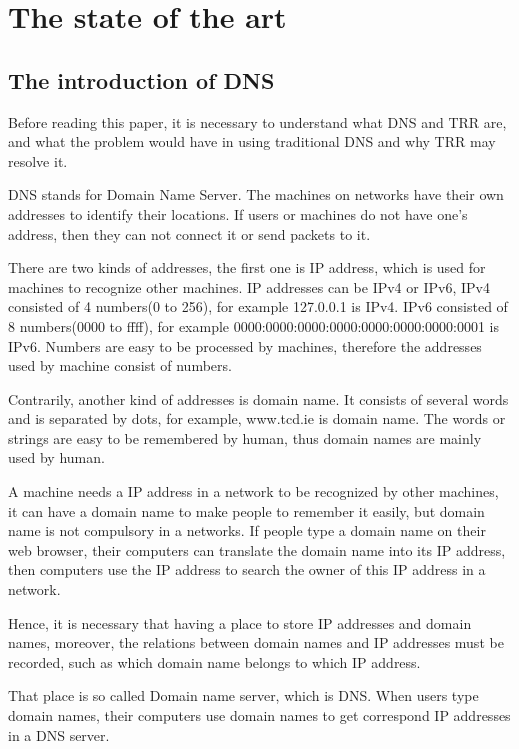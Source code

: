 
\chapter{The state of the art}

	\section{The introduction of DNS}
	
	Before reading this paper, it is necessary to understand what DNS and TRR are, and what the problem would have in using traditional DNS and why TRR may resolve it.
	
	DNS stands for Domain Name Server. The machines on networks have their own addresses to identify their locations. If users or machines do not have one's address, then they can not connect it or send packets to it.
	
	There are two kinds of addresses, the first one is IP address, which is used for machines to recognize other machines. IP addresses can be IPv4 or IPv6, IPv4 consisted of 4 numbers(0 to 256)\cite{IPv4}, for example 127.0.0.1 is IPv4. IPv6 consisted of 8 numbers(0000 to ffff)\cite{IPv6}, for example 0000:0000:0000:0000:0000:0000:0000:0001 is IPv6. Numbers are easy to be processed by machines, therefore the addresses used by machine consist of numbers.
	
	Contrarily, another kind of addresses is domain name. It consists of several words and is separated by dots, for example, www.tcd.ie is domain name. The words or strings are easy to be remembered by human, thus domain names are mainly used by human\cite{Domain_name}. 
	
	A machine needs a IP address in a network to be recognized by other machines, it can have a domain name to make people to remember it easily, but domain name is not compulsory in a networks. If people type a domain name on their web browser, their computers can translate the domain name into its IP address, then computers use the IP address to search the owner of this IP address in a network.
	
	Hence, it is necessary that having a place to store IP addresses and domain names, moreover, the relations between domain names and IP addresses must be recorded, such as which domain name belongs to which IP address.
	
	That place is so called Domain name server, which is DNS. When users type domain names, their computers use domain names to get correspond IP addresses in a DNS server\cite{what_is_DNS}. 
	
